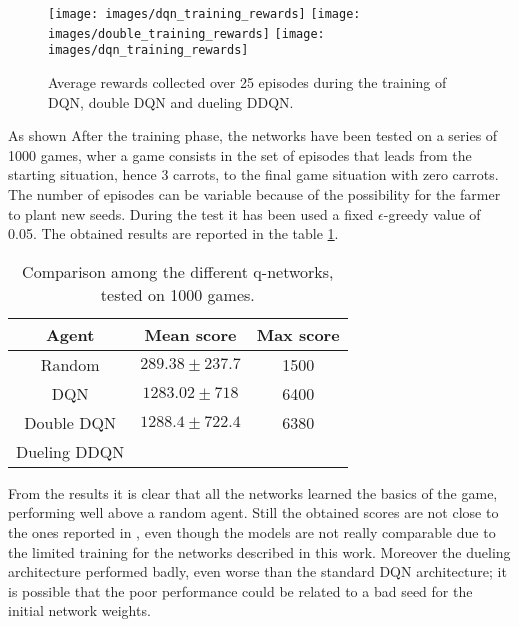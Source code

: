 \documentclass[article,11pt]{article}
\begin{document}
	\begin{figure}
		\texttt{[image: images/dqn\_training\_rewards]}
		\endminipage\hfill
		\texttt{[image: images/double\_training\_rewards]}
		\endminipage\hfill
		\texttt{[image: images/dqn\_training\_rewards]}
		\endminipage
		\label{fig:average_reward}
		\caption{Average rewards collected over 25 episodes during the training of DQN, double DQN and dueling DDQN.}
	\end{figure}
	As shown
	After the training phase, the networks have been tested on a series of 1000 games, wher a game consists in the set of episodes that leads from the starting situation, hence 3 carrots, to the final game situation with zero carrots. The number of episodes can be variable because of the possibility for the farmer to plant new seeds. During the test it has been used a fixed $\epsilon$-greedy value of 0.05.
	The obtained results are reported in the table \ref{tab:test}.
	\begin{table}
		\centering
		\begin{tabular}{|c|c|c|}
			\hline
			Agent	& Mean score & Max score\\
			\hline
			Random & $289.38 \pm 237.7$ & 1500 \\
			DQN & $1283.02 \pm 718$ & 6400\\
			Double DQN & $1288.4 \pm 722.4$ & 6380 \\
			Dueling DDQN & & \\
			\hline
		\end{tabular}
		\caption{Comparison among the different q-networks, tested on 1000 games.}
		\label{tab:test}
	\end{table}

	From the results it is clear that all the networks learned the basics of the game, performing well above a random agent. Still the obtained scores are not close to the ones reported in \cite{combined_dqn}, even though the models are not really comparable due to the limited training for the networks described in this work. Moreover the dueling architecture performed badly, even worse than the standard DQN architecture; it is possible that the poor performance could be related to a bad seed for the initial network weights.
	
\end{document}
